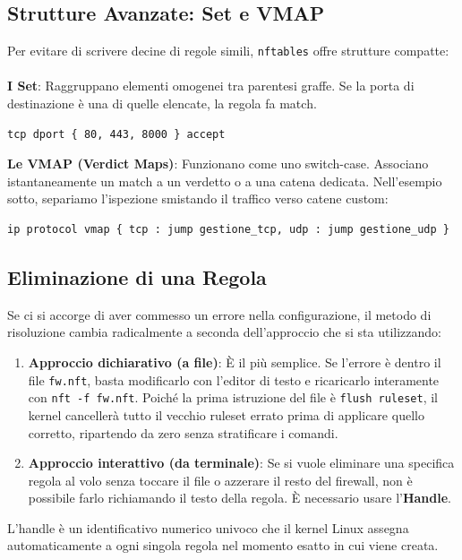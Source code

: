 \documentclass[12pt,a4paper]{report}
\begin{document}
	\subsection{Strutture Avanzate: Set e VMAP}
	Per evitare di scrivere decine di regole simili, \texttt{nftables} offre strutture compatte:\\\\
	\textbf{I Set}: Raggruppano elementi omogenei tra parentesi graffe. Se la porta di destinazione è una di quelle elencate, la regola fa match.
	\begin{lstlisting}[language=bash]
		tcp dport { 80, 443, 8000 } accept
	\end{lstlisting}
	\textbf{Le VMAP (Verdict Maps)}: Funzionano come uno switch-case. Associano istantaneamente un match a un verdetto o a una catena dedicata. Nell'esempio sotto, separiamo l'ispezione smistando il traffico verso catene custom:
	\begin{lstlisting}[language=bash]
		ip protocol vmap { tcp : jump gestione_tcp, udp : jump gestione_udp }
	\end{lstlisting}
	
	\subsection{Eliminazione di una Regola}
	
	Se ci si accorge di aver commesso un errore nella configurazione, il metodo di risoluzione cambia radicalmente a seconda dell'approccio che si sta utilizzando:
	
	\begin{enumerate}
		\item \textbf{Approccio dichiarativo (a file)}: È il più semplice. Se l'errore è dentro il file \texttt{fw.nft}, basta modificarlo con l'editor di testo e ricaricarlo interamente con \texttt{nft -f fw.nft}. Poiché la prima istruzione del file è \texttt{flush ruleset}, il kernel cancellerà tutto il vecchio ruleset errato prima di applicare quello corretto, ripartendo da zero senza stratificare i comandi.
		\item \textbf{Approccio interattivo (da terminale)}: Se si vuole eliminare una specifica regola al volo senza toccare il file o azzerare il resto del firewall, non è possibile farlo richiamando il testo della regola. È necessario usare l'\textbf{Handle}.
	\end{enumerate}
	L'handle è un identificativo numerico univoco che il kernel Linux assegna automaticamente a ogni singola regola nel momento esatto in cui viene creata.
	
\end{document}
